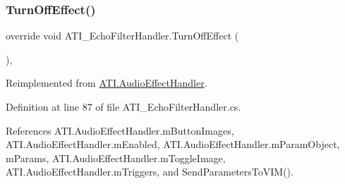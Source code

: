 \subsubsection{\texorpdfstring{Turn\+Off\+Effect()}{TurnOffEffect()}}
{\footnotesize\ttfamily override void A\+T\+I\+\_\+\+Echo\+Filter\+Handler.\+Turn\+Off\+Effect (\begin{DoxyParamCaption}{ }\end{DoxyParamCaption})\hspace{0.3cm}{\ttfamily [protected]}, {\ttfamily [virtual]}}



Reimplemented from \hyperlink{class_a_t_i_1_1_audio_effect_handler_aed35f816dce2a75b857c79ffbb6cc677}{A\+T\+I.\+Audio\+Effect\+Handler}.



Definition at line 87 of file A\+T\+I\+\_\+\+Echo\+Filter\+Handler.\+cs.



References A\+T\+I.\+Audio\+Effect\+Handler.\+m\+Button\+Images, A\+T\+I.\+Audio\+Effect\+Handler.\+m\+Enabled, A\+T\+I.\+Audio\+Effect\+Handler.\+m\+Param\+Object, m\+Params, A\+T\+I.\+Audio\+Effect\+Handler.\+m\+Toggle\+Image, A\+T\+I.\+Audio\+Effect\+Handler.\+m\+Triggers, and Send\+Parameters\+To\+V\+I\+M().


